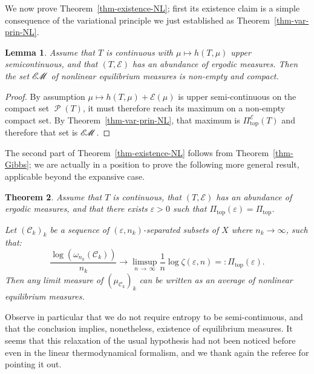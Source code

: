 \documentclass[10pt]{amsart}
\newtheorem{theo}{Theorem}[section]
\newtheorem{lemm}[theo]{Lemma}\newtheorem{prop}[theo]{Proposition}\newtheorem{coro}[theo]{Corollary}\newtheorem{conj}[theo]{Conjecture}
\theoremstyle{definition}\newtheorem{defi}[theo]{Definition}\newtheorem{rema}[theo]{Remark}\newtheorem{exam}[theo]{Example}\newtheorem{exem}[theo]{Example}\newtheorem{nota}[theo]{Notation}
\theoremstyle{plain}
\theoremstyle{plain}
\newcommand\eps{\varepsilon}
\newcommand\NLP{\Pi}
\renewcommand\top{{\mathrm{top}}}
\newcommand\Prob{{\operatorname{\mathscr{P}}}}
\newcommand{\EM}{\mathscr{E\kern-2pt M}}
\newcommand*\8{\infty}
\newcommand{\En}{\mathcal{E}}
\newcommand{\cC}{\mathcal C}
\begin{document}
We now prove Theorem~\ref{thm-existence-NL}; first its existence claim is a simple consequence of the variational principle we just established as Theorem~\ref{thm-var-prin-NL}.

\begin{lemm}\label{lemm-existence}
Assume that $T$ is continuous with $\mu\mapsto h(T,\mu)$ upper semi\-conti\-nuous, and that $(T,\En)$ has an abundance of ergodic measures. Then the set $\EM$ of nonlinear equilibrium measures is non-empty and compact.
\end{lemm}

\begin{proof}
By assumption $\mu\mapsto h(T,\mu)+\En(\mu)$ is upper semi-continuous on the compact set $\Prob(T)$, it must therefore reach its maximum on a non-empty compact set. By Theorem~\ref{thm-var-prin-NL}, that maximum is $\NLP^\En_\top(T)$ and therefore that set is $\EM$.
\end{proof}

The second part of Theorem~\ref{thm-existence-NL} follows from Theorem~\ref{thm-Gibbs}; we are actually in a position to prove the following more general result, applicable beyond the expansive case.


\begin{theo}\label{thm-weak-Gibbs}
Assume that $T$ is continuous, that $(T,\En)$ has an abundance of ergodic measures, and that there exists $\eps>0$ such that $\NLP_\top(\varepsilon) = \NLP_\top$.

Let $(\cC_k)_k$ be a sequence of $(\varepsilon,n_k)$-separated subsets of $X$ where $n_k\to\infty$, such that:
\begin{equation}
\frac{\log(\omega_{n_k}(\cC_k))}{n_k} \to \limsup_{n\,\to\,\infty}\frac1n\log\zeta(\eps,n) =:\NLP_\top(\varepsilon).\label{eq-aGibbs}
\end{equation}
Then any limit measure of $(\mu_{\cC_k})_k$ can be written as an average of nonlinear equilibrium measures.
\end{theo}

Observe in particular that we do not require entropy to be semi-continuous, and that the conclusion implies, nonetheless, existence of equilibrium measures. It seems that this relaxation of the usual hypothesis had not been noticed before even in the linear thermodynamical formalism, and we thank again the referee for pointing it out.
\end{document}

